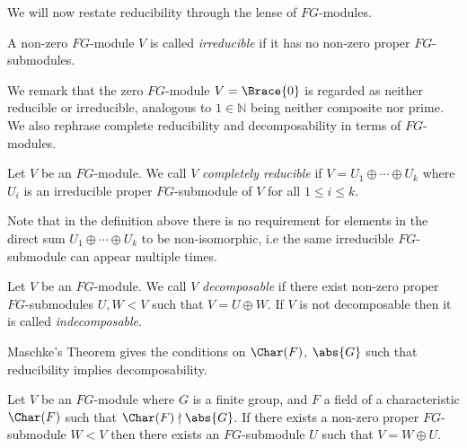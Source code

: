 \documentclass[../Project.tex]{subfiles}
\begin{document}
We will now restate reducibility through the lense of $FG$-modules.

\begin{defi}
A non-zero $FG$-module $V$ is called \textit{irreducible} if it has no non-zero proper $FG$-submodules.
\end{defi}

We remark that the zero $FG$-module $V = \Brace{0}$ is regarded as neither reducible or irreducible, analogous to $1 \in \mathbb{N}$ being neither composite nor prime.\\

We also rephrase complete reducibility and decomposability in terms of $FG$-modules.

\begin{defi}
	Let $V$ be an $FG$-module. We call $V$ \textit{completely reducible} if $V = U_1 \oplus \cdots \oplus U_k$ where $U_i$ is an irreducible proper $FG$-submodule of $V$ for all $1 \leqslant i \leqslant k$.\\
\end{defi}
Note that in the definition above there is no requirement for elements in the direct sum $U_1 \oplus \cdots \oplus U_k$ to be non-isomorphic, i.e the same irreducible $FG$-submodule can appear multiple times.\\

\begin{defi}
	Let $V$ be an $FG$-module. We call $V$ \textit{decomposable} if there exist non-zero proper $FG$-submodules $U,W < V$ such that $V = U \oplus W$. If $V$ is not decomposable then it is called \textit{indecomposable}.\\
\end{defi}


Maschke's Theorem gives the conditions on $\Char(F)$, $\abs{G}$ such that reducibility implies decomposability.
\begin{theo}
	Let $V$  be an $FG$-module where $G$ is a finite group, and $F$ a field of a characteristic $\Char(F)$ such that $\Char(F) \nmid \abs{G}$. If there exists a non-zero proper $FG$-submodule $W < V$ then there exists an $FG$-submodule $U$ such that $V = W \oplus U$. \label{3}\\
\end{theo}
\end{document}
